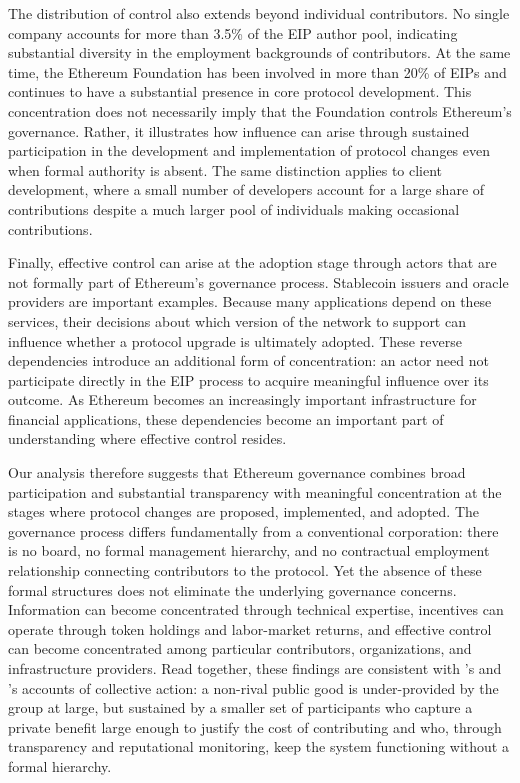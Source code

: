 \documentclass[No]{AEA}
\begin{document}
The distribution of control also extends beyond individual contributors. No single company accounts for more than 3.5\% of the EIP author pool, indicating substantial diversity in the employment backgrounds of contributors. At the same time, the Ethereum Foundation has been involved in more than 20\% of EIPs and continues to have a substantial presence in core protocol development. This concentration does not necessarily imply that the Foundation controls Ethereum's governance. Rather, it illustrates how influence can arise through sustained participation in the development and implementation of protocol changes even when formal authority is absent. The same distinction applies to client development, where a small number of developers account for a large share of contributions despite a much larger pool of individuals making occasional contributions.

Finally, effective control can arise at the adoption stage through actors that are not formally part of Ethereum's governance process. Stablecoin issuers and oracle providers are important examples. Because many applications depend on these services, their decisions about which version of the network to support can influence whether a protocol upgrade is ultimately adopted. These reverse dependencies introduce an additional form of concentration: an actor need not participate directly in the EIP process to acquire meaningful influence over its outcome. As Ethereum becomes an increasingly important infrastructure for financial applications, these dependencies become an important part of understanding where effective control resides.

Our analysis therefore suggests that Ethereum governance combines broad participation and substantial transparency with meaningful concentration at the stages where protocol changes are proposed, implemented, and adopted. The governance process differs fundamentally from a conventional corporation: there is no board, no formal management hierarchy, and no contractual employment relationship connecting contributors to the protocol. Yet the absence of these formal structures does not eliminate the underlying governance concerns. Information can become concentrated through technical expertise, incentives can operate through token holdings and labor-market returns, and effective control can become concentrated among particular contributors, organizations, and infrastructure providers. Read together, these findings are consistent with \cite{Olson1965}'s and \cite{Ostrom1990}'s accounts of collective action: a non-rival public good is under-provided by the group at large, but sustained by a smaller set of participants who capture a private benefit large enough to justify the cost of contributing and who, through transparency and reputational monitoring, keep the system functioning without a formal hierarchy.
\end{document}
